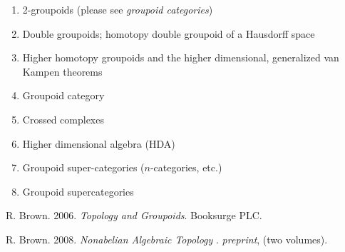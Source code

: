 \documentclass[12pt]{article}
\theoremstyle{plain}
\theoremstyle{definition}
\numberwithin{equation}{section}
\newcommand{\med}{\medbreak}
\begin{document}
\begin{enumerate}
\item 2-groupoids (please see \emph{groupoid categories})
\item Double groupoids; homotopy double groupoid of a Hausdorff space
\item Higher homotopy groupoids and the higher dimensional, generalized van Kampen theorems
\item Groupoid category
\item Crossed complexes
\item Higher dimensional algebra (HDA)
\item Groupoid super-categories ($n$-categories, etc.)
\item Groupoid supercategories
\end{enumerate}
\med

\begin{thebibliography}{9}

R. Brown. 2006. {\em Topology and Groupoids}. Booksurge PLC. 

R. Brown. 2008. {\em Nonabelian Algebraic Topology }. {\em preprint}, (two volumes).

\end{thebibliography}
\end{document}

